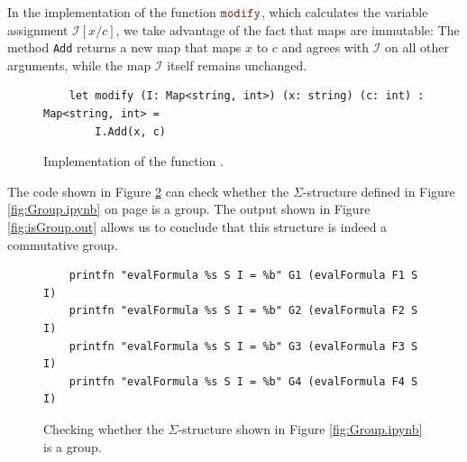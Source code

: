 In the implementation of the function $\mytt{modify}$, which calculates the variable assignment
$\mathcal{I}[x/c]$, we take advantage of the fact that \Fsharp{} maps are immutable:  The method \texttt{Add}
returns a new map that maps $x$ to $c$ and agrees with $\mathcal{I}$ on all other arguments, while the map
$\mathcal{I}$ itself remains unchanged.


\begin{figure}[!ht]
\centering
\begin{verbatim}
    let modify (I: Map<string, int>) (x: string) (c: int) : Map<string, int> =
        I.Add(x, c)
\end{verbatim}
\vspace*{-0.3cm}
\caption{Implementation of the function .}
\label{fig:modify.ipynb}
\end{figure}



The code shown in Figure \ref{fig:isGroup.ipynb} can check whether the $\Sigma$-structure defined in
Figure \ref{fig:Group.ipynb} on page \pageref{fig:Group.ipynb} is a group. The output shown in Figure
\ref{fig:isGroup.out} allows us to conclude that this structure is indeed a commutative group. 


\begin{figure}[!ht]
\centering
\begin{verbatim}
    printfn "evalFormula %s S I = %b" G1 (evalFormula F1 S I)
    printfn "evalFormula %s S I = %b" G2 (evalFormula F2 S I)
    printfn "evalFormula %s S I = %b" G3 (evalFormula F3 S I)
    printfn "evalFormula %s S I = %b" G4 (evalFormula F4 S I)
\end{verbatim}
\vspace*{-0.3cm}
\caption{Checking whether the $\Sigma$-structure shown in Figure \ref{fig:Group.ipynb} is a group.}
\label{fig:isGroup.ipynb}
\end{figure}

